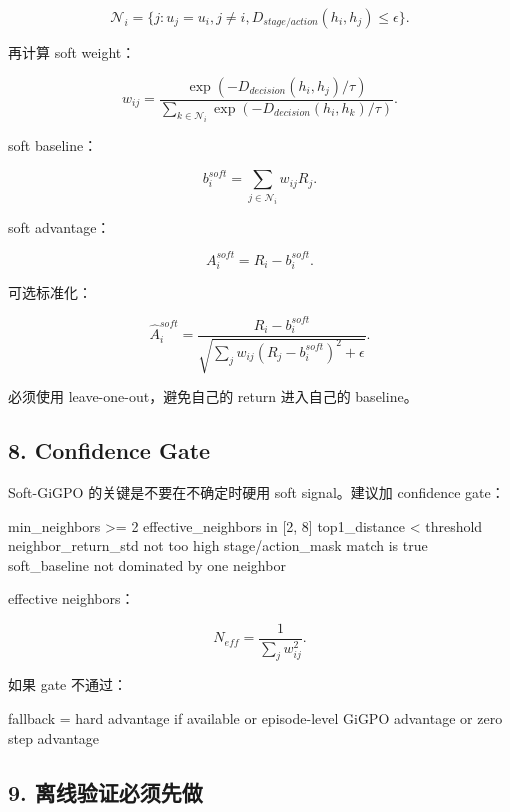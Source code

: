 \documentclass[
  10pt,
]{ctexart}
\newenvironment{Shaded}{}{}
\newcommand{\NormalTok}[1]{#1}
\begin{document}
\[
\mathcal{N}_i
=
\{j: u_j=u_i, j\ne i, D_{stage/action}(h_i,h_j)\le\epsilon\}.
\]

再计算 soft weight：

\[
w_{ij}=
\frac{\exp(-D_{decision}(h_i,h_j)/\tau)}
{\sum_{k\in\mathcal{N}_i}\exp(-D_{decision}(h_i,h_k)/\tau)}.
\]

soft baseline：

\[
b_i^{soft}=\sum_{j\in\mathcal{N}_i}w_{ij}R_j.
\]

soft advantage：

\[
A_i^{soft}=R_i-b_i^{soft}.
\]

可选标准化：

\[
\hat A_i^{soft}
=
\frac{R_i-b_i^{soft}}
{\sqrt{\sum_jw_{ij}(R_j-b_i^{soft})^2+\epsilon}}.
\]

必须使用 leave-one-out，避免自己的 return 进入自己的 baseline。

\subsection{8. Confidence Gate}\label{confidence-gate}

Soft-GiGPO 的关键是不要在不确定时硬用 soft signal。建议加 confidence
gate：

\begin{Shaded}
\begin{Highlighting}[]
\NormalTok{min\_neighbors \textgreater{}= 2}
\NormalTok{effective\_neighbors in [2, 8]}
\NormalTok{top1\_distance \textless{} threshold}
\NormalTok{neighbor\_return\_std not too high}
\NormalTok{stage/action\_mask match is true}
\NormalTok{soft\_baseline not dominated by one neighbor}
\end{Highlighting}
\end{Shaded}

effective neighbors：

\[
N_{eff}=\frac{1}{\sum_jw_{ij}^2}.
\]

如果 gate 不通过：

\begin{Shaded}
\begin{Highlighting}[]
\NormalTok{fallback = hard advantage if available}
\NormalTok{        or episode{-}level GiGPO advantage}
\NormalTok{        or zero step advantage}
\end{Highlighting}
\end{Shaded}

\subsection{9.
离线验证必须先做}\label{ux79bbux7ebfux9a8cux8bc1ux5fc5ux987bux5148ux505a}
\end{document}
